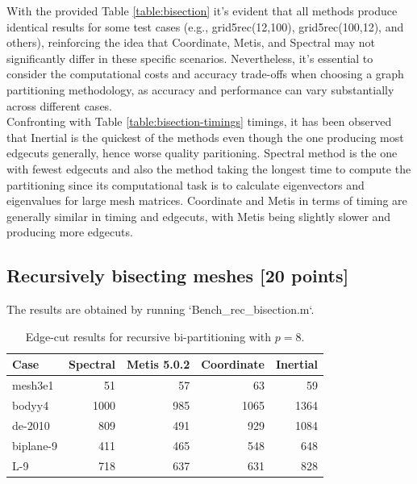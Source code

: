 \documentclass[unicode,11pt,a4paper,oneside,numbers=endperiod,openany]{scrartcl}
\begin{document}
With the provided Table \ref{table:bisection} it's evident that all methods produce identical results for some test cases
(e.g., grid5rec(12,100), grid5rec(100,12), and others), reinforcing the idea that Coordinate, Metis, and
Spectral may not significantly differ in these specific scenarios.
Nevertheless, it's essential to consider the computational costs and accuracy trade-offs when choosing a graph partitioning methodology,
as accuracy and performance can vary substantially across different cases. \\

Confronting with Table \ref{table:bisection-timings} timings, it has been observed that Inertial is the quickest of the methods
even though the one producing most edgecuts generally, hence worse quality paritioning.
Spectral method is the one with fewest edgecuts and also the method taking the longest time to compute the partitioning
since its computational task is to calculate eigenvectors and eigenvalues for large mesh matrices.
Coordinate and Metis in terms of timing are generally similar in timing and edgecuts, with Metis being slightly slower and producing more edgecuts. \\
\cleardoublepage

\subsection{Recursively bisecting meshes [20 points]}

The results are obtained by running `Bench\_rec\_bisection.m`. \\

\begin{table}[H]
    \caption{Edge-cut results for recursive bi-partitioning with $p=8$.}
    \centering
    \begin{tabular}{l|r|r|r|r} \hline\hline
        Case      & Spectral & Metis 5.0.2 & Coordinate & Inertial \\ \hline
        mesh3e1   & 51       & 57          & 63         & 59       \\
        bodyy4    & 1000     & 985         & 1065       & 1364     \\
        de-2010   & 809      & 491         & 929        & 1084     \\
        biplane-9 & 411      & 465         & 548        & 648      \\
        L-9       & 718      & 637         & 631        & 828      \\  \hline \hline
    \end{tabular}
    \label{table:rec_p8}
\end{table}
\end{document}
